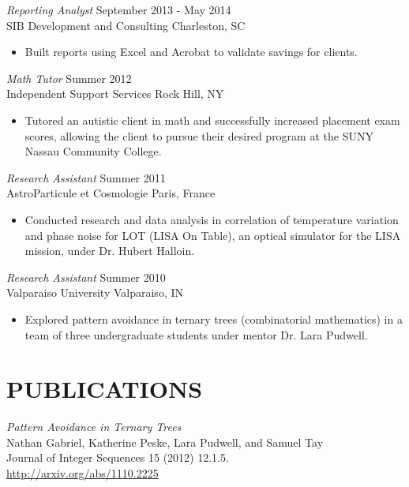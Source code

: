 \documentclass[margin]{res}
\begin{document}
\begin{resume}
  {\sl Reporting Analyst} \hfill            September 2013 - May 2014 \\
  SIB Development and Consulting \hfill Charleston, SC
  \begin{itemize}  \itemsep -2pt %
    \item Built reports using Excel and Acrobat to validate savings for clients.
  \end{itemize}

  {\sl Math Tutor} \hfill        Summer 2012 \\
  Independent Support Services \hfill Rock Hill, NY
  \begin{itemize}
    \item Tutored an autistic client in math and successfully increased placement exam
      scores, allowing the client to pursue their desired program at the SUNY Nassau
      Community College.
  \end{itemize} 
 
  {\sl Research Assistant} \hfill        Summer 2011 \\
  AstroParticule et Cosmologie \hfill Paris, France
  \begin{itemize}
    \item Conducted research and data analysis in correlation of temperature variation and
      phase noise for LOT (LISA On Table), an optical simulator for the LISA mission,
      under Dr. Hubert Halloin.
  \end{itemize} 

  {\sl Research Assistant} \hfill        Summer 2010 \\
  Valparaiso University \hfill Valparaiso, IN
  \begin{itemize}
    \item Explored pattern avoidance in ternary trees (combinatorial mathematics) in a
      team of three undergraduate students under mentor Dr. Lara Pudwell.
  \end{itemize} 

\section{PUBLICATIONS}             
  {\sl Pattern Avoidance in Ternary Trees} \\
  Nathan Gabriel, Katherine Peske, Lara Pudwell, and Samuel Tay \\
  Journal of Integer Sequences 15 (2012) 12.1.5. \\
  \url{http://arxiv.org/abs/1110.2225}

\end{resume}
\end{document}
